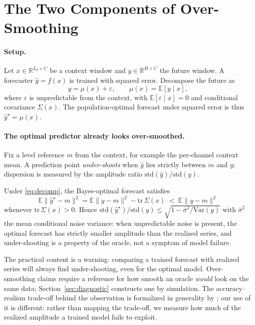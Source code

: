\section{The Two Components of Over-Smoothing}
\label{sec:theory}

\paragraph{Setup.}
Let $x \in \mathbb{R}^{L_0 \times C}$ be a context window and $y \in \mathbb{R}^{H \times C}$ the future window. A forecaster $\hat{y} = f(x)$ is trained with squared error. Decompose the future as
\begin{equation}
    y = \mu(x) + \varepsilon, \qquad \mu(x) = \mathbb{E}[y \mid x],
    \label{eq:decomp}
\end{equation}
where $\varepsilon$ is unpredictable from the context, with $\mathbb{E}[\varepsilon \mid x] = 0$ and conditional covariance $\Sigma(x)$. The population-optimal forecast under squared error is thus $\hat{y}^\star = \mu(x)$.

\paragraph{The optimal predictor already looks over-smoothed.}

Fix a level reference $m$ from the context, for example the per-channel context mean. A prediction point \emph{under-shoots} when $\hat{y}$ lies strictly between $m$ and $y$; dispersion is measured by the amplitude ratio $\mathrm{std}(\hat{y}) / \mathrm{std}(y)$.

\begin{proposition}
\label{prop:oracle}
Under \eqref{eq:decomp}, the Bayes-optimal forecast satisfies
\begin{equation}
    \mathbb{E}\|\hat{y}^\star - m\|^2 = \mathbb{E}\|y - m\|^2 - \mathrm{tr}\,\Sigma(x) \; < \; \mathbb{E}\|y - m\|^2
\end{equation}
whenever $\mathrm{tr}\,\Sigma(x) > 0$. Hence $\mathrm{std}(\hat{y}^\star) / \mathrm{std}(y) \le \sqrt{1 - \bar{\sigma}^2 / \mathrm{Var}(y)}$ with $\bar{\sigma}^2$ the mean conditional noise variance: when unpredictable noise is present, the optimal forecast has strictly smaller amplitude than the realized series, and under-shooting is a property of the oracle, not a symptom of model failure.
\end{proposition}

The practical content is a warning: comparing a trained forecast with realized series will always find under-shooting, even for the optimal model. Over-smoothing claims require a reference for how smooth an oracle \emph{would} look on the same data; Section~\ref{sec:diagnostic} constructs one by simulation. The accuracy--realism trade-off behind the observation is formalized in generality by \citet{green2026expectations}; our use of it is different: rather than mapping the trade-off, we measure how much of the realized amplitude a trained model fails to exploit.

